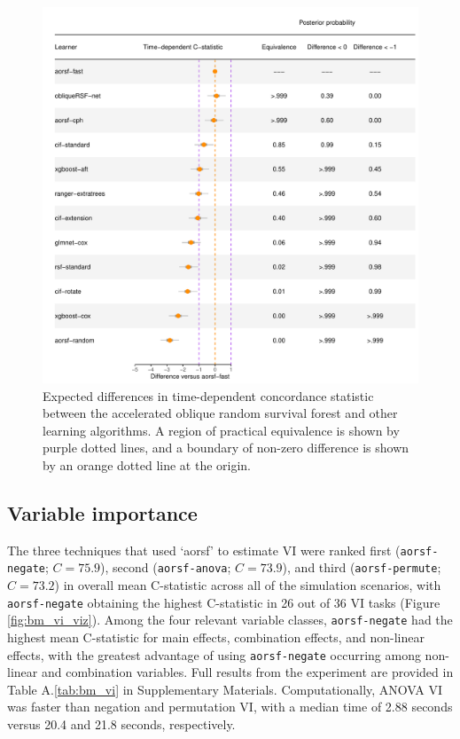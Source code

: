 \documentclass[12pt]{article}\usepackage[]{graphicx}\usepackage[]{xcolor}
\makeatletter
\def\maxwidth{ %
  \ifdim\Gin@nat@width>\linewidth
    \linewidth
  \else
    \Gin@nat@width
  \fi
}
\newenvironment{knitrout}{}{} %
\newcommand{\tabrefAppendix}[1]{Table A.\ref{#1}}
\makeatother
\begin{document}
\begin{knitrout}
\color{fgcolor}\begin{figure}
\includegraphics[width=\maxwidth]{figure/bm_pred_model_viz_cstat-1} \caption[Expected differences in time-dependent concordance statistic between the accelerated oblique random survival forest and other learning algorithms]{Expected differences in time-dependent concordance statistic between the accelerated oblique random survival forest and other learning algorithms. A region of practical equivalence is shown by purple dotted lines, and a boundary of non-zero difference is shown by an orange dotted line at the origin.}\label{fig:bm_pred_model_viz_cstat}
\end{figure}

\end{knitrout}

\subsection{Variable importance} \label{sec:results_vi}



The three techniques that used `aorsf' to estimate VI were ranked first (\texttt{aorsf-negate}; $C = 75.9$), second (\texttt{aorsf-anova}; $C = 73.9$), and third (\texttt{aorsf-permute}; $C = 73.2$) in overall mean C-statistic across all of the simulation scenarios, with \texttt{aorsf-negate} obtaining the highest C-statistic in 26 out of 36 VI tasks (Figure \ref{fig:bm_vi_viz}). Among the four relevant variable classes, \texttt{aorsf-negate} had the highest mean C-statistic for main effects, combination effects, and non-linear effects, with the greatest advantage of using \texttt{aorsf-negate} occurring among non-linear and combination variables. Full results from the experiment are provided in \tabrefAppendix{tab:bm_vi} in Supplementary Materials. Computationally, ANOVA VI was faster than negation and permutation VI, with a median time of 2.88 seconds versus 20.4 and 21.8 seconds, respectively.
\end{document}
